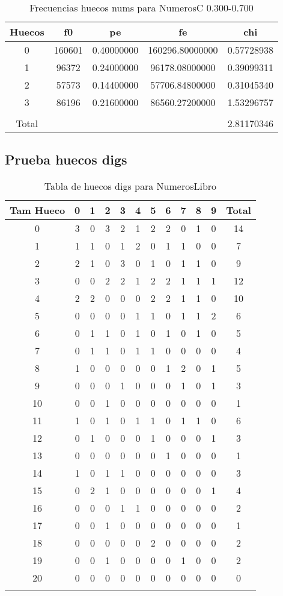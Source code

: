 \documentclass[a4paper]{article}
\begin{document}
\begin{table}
\centering
\begin{tabular}{ccccc}
\\\hline
Huecos&f0&pe&fe&chi\\\hline
0&160601&0.40000000&160296.80000000&0.57728938\\
1&96372&0.24000000&96178.08000000&0.39099311\\
2&57573&0.14400000&57706.84800000&0.31045340\\
3&86196&0.21600000&86560.27200000&1.53296757\\
\\\hline
Total & & & &2.81170346\\\hline
\end{tabular}
\caption{\label{tab:frechuecosnumsNumerosC}Frecuencias huecos nums para NumerosC 0.300-0.700}
\end{table}

\subsection{Prueba huecos digs}

\begin{table}
\centering
\begin{tabular}{cccccccccccc}
\\\hline
Tam Hueco&0&1&2&3&4&5&6&7&8&9&Total\\\hline
0&3&0&3&2&1&2&2&0&1&0&14\\
1&1&1&0&1&2&0&1&1&0&0&7\\
2&2&1&0&3&0&1&0&1&1&0&9\\
3&0&0&2&2&1&2&2&1&1&1&12\\
4&2&2&0&0&0&2&2&1&1&0&10\\
5&0&0&0&0&1&1&0&1&1&2&6\\
6&0&1&1&0&1&0&1&0&1&0&5\\
7&0&1&1&0&1&1&0&0&0&0&4\\
8&1&0&0&0&0&0&1&2&0&1&5\\
9&0&0&0&1&0&0&0&1&0&1&3\\
10&0&0&1&0&0&0&0&0&0&0&1\\
11&1&0&1&0&1&1&0&1&1&0&6\\
12&0&1&0&0&0&1&0&0&0&1&3\\
13&0&0&0&0&0&0&1&0&0&0&1\\
14&1&0&1&1&0&0&0&0&0&0&3\\
15&0&2&1&0&0&0&0&0&0&1&4\\
16&0&0&0&1&1&0&0&0&0&0&2\\
17&0&0&1&0&0&0&0&0&0&0&1\\
18&0&0&0&0&0&2&0&0&0&0&2\\
19&0&0&1&0&0&0&0&1&0&0&2\\
20&0&0&0&0&0&0&0&0&0&0&0\\
\\\hline
\end{tabular}
\caption{\label{tab:huecosdigsNumerosLibro}Tabla de huecos digs para NumerosLibro}
\end{table}
\end{document}

